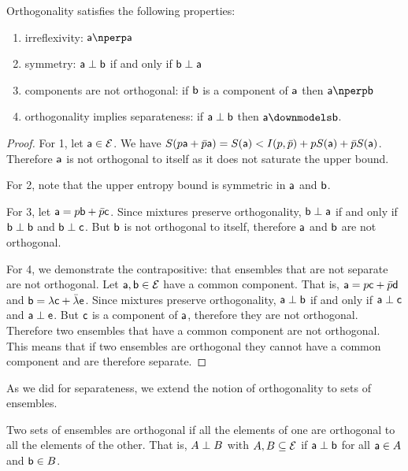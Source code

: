 \begin{mathSection}
\begin{prop}\label{pm_es_orthoProps}
	Orthogonality satisfies the following properties:
	\begin{enumerate}
		\item irreflexivity: $\ens[a] \northo \ens[a]$
		\item symmetry: $\ens[a] \ortho \ens[b]$ if and only if $\ens[b] \ortho \ens[a]$
		\item components are not orthogonal: if $\ens[b]$ is a component of $\ens[a]$ then $\ens[a] \northo \ens[b]$
		\item orthogonality implies separateness: if $\ens[a] \ortho \ens[b]$ then $\ens[a] \separate \ens[b]$.
	\end{enumerate}
\end{prop}

\begin{proof}
	For 1, let $\ens[a] \in \Ens$. We have $S(p\ens[a] + \bar{p}\ens[a]) = S(\ens[a]) < I(p,\bar{p}) + p S(\ens[a]) + \bar{p} S(\ens[a])$. Therefore $\ens[a]$ is not orthogonal to itself as it does not saturate the upper bound.
	
	For 2, note that the upper entropy bound is symmetric in $\ens[a]$ and $\ens[b]$.
	
	For 3, let $\ens[a] = p \ens[b] + \bar{p} \ens[c]$. Since mixtures preserve orthogonality, $\ens[b] \ortho \ens[a]$ if and only if $\ens[b] \ortho \ens[b]$ and $\ens[b] \ortho \ens[c]$. But $\ens[b]$ is not orthogonal to itself, therefore $\ens[a]$ and $\ens[b]$ are not orthogonal.
	
	For 4, we demonstrate the contrapositive: that ensembles that are not separate are not orthogonal. Let $\ens[a], \ens[b] \in \Ens$ have a common component. That is, $\ens[a] = p \ens[c] + \bar{p} \ens[d]$ and $\ens[b] = \lambda \ens[c] + \bar{\lambda} \ens[e]$. Since mixtures preserve orthogonality, $\ens[a] \ortho \ens[b]$ if and only if $\ens[a] \ortho \ens[c]$ and $\ens[a] \ortho \ens[e]$. But $\ens[c]$ is a component of $\ens[a]$, therefore they are not orthogonal. Therefore two ensembles that have a common component are not orthogonal. This means that if two ensembles are orthogonal they cannot have a common component and are therefore separate.
\end{proof}

As we did for separateness, we extend the notion of orthogonality to sets of ensembles.

\begin{defn}
	Two sets of ensembles are orthogonal if all the elements of one are orthogonal to all the elements of the other. That is, $A \ortho B$ with $A, B \subseteq \Ens$ if $\ens[a] \ortho \ens[b]$ for all $\ens[a] \in A$ and $\ens[b] \in B$. 
\end{defn}


\end{mathSection}
